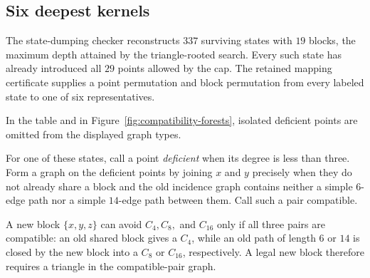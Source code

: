 \documentclass[11pt]{article}
\theoremstyle{definition}
\begin{document}
\subsection{Six deepest kernels}

The state-dumping checker reconstructs \(337\) surviving states with
\(19\) blocks, the maximum depth attained by the triangle-rooted search.
Every such state has already introduced all \(29\) points allowed by the cap.
The retained mapping certificate supplies a point permutation and
block permutation from every labeled state to one of six representatives.



In the table and in Figure~\ref{fig:compatibility-forests}, isolated deficient
points are omitted from the displayed graph types.

For one of these states, call a point \emph{deficient} when its degree is
less than three. Form a graph on the deficient points by joining \(x\) and
\(y\) precisely when they do not already share a block and the old incidence
graph contains neither a simple \(6\)-edge path nor a simple \(14\)-edge path
between them. Call such a pair compatible.

A new block \(\{x,y,z\}\) can avoid \(C_4,C_8,\) and \(C_{16}\) only if all
three pairs are compatible: an old shared block gives a \(C_4\), while an
old path of length \(6\) or \(14\) is closed by the new block into a \(C_8\)
or \(C_{16}\), respectively. A legal new block therefore requires a triangle
in the compatible-pair graph.
\end{document}
